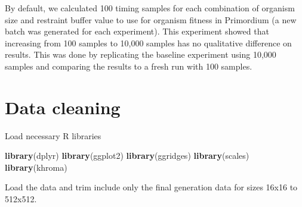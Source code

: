\documentclass[]{book}
\newenvironment{Shaded}{\begin{snugshade}}{\end{snugshade}}
\newcommand{\KeywordTok}[1]{\textcolor[rgb]{0.13,0.29,0.53}{\textbf{#1}}}
\newcommand{\NormalTok}[1]{#1}
\begin{document}
By default, we calculated 100 timing samples for each combination of organism size and restraint buffer value to use for organism fitness in Primordium (a new batch was generated for each experiment).
This experiment showed that increasing from 100 samples to 10,000 samples has no qualitative difference on results.
This was done by replicating the baseline experiment using 10,000 samples and comparing the results to a fresh run with 100 samples.

\hypertarget{data-cleaning-2}{%
\section{Data cleaning}\label{data-cleaning-2}}

Load necessary R libraries

\begin{Shaded}
\begin{Highlighting}[]
\KeywordTok{library}\NormalTok{(dplyr)}
\KeywordTok{library}\NormalTok{(ggplot2)}
\KeywordTok{library}\NormalTok{(ggridges)}
\KeywordTok{library}\NormalTok{(scales)}
\KeywordTok{library}\NormalTok{(khroma)}
\end{Highlighting}
\end{Shaded}

Load the data and trim include only the final generation data for sizes 16x16 to 512x512.
\end{document}
